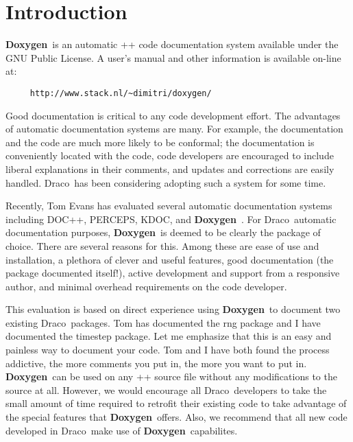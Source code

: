 \documentclass[11pt]{nmemo}
\newcommand{\draco}{{\normalfont\sffamily Draco}}
\newcommand{\doxy}{{\normalfont\bfseries Doxygen}}
\begin{document}

\section{Introduction}

\doxy\ is an automatic \C++ code documentation system available under
the GNU Public License.  A user's manual and other information is
available on-line at:
\begin{verbatim} 
     http://www.stack.nl/~dimitri/doxygen/ 
\end{verbatim}

Good documentation is critical to any code development effort.  The
advantages of automatic documentation systems are many.  For example,
the documentation and the code are much more likely to be conformal;
the documentation is conveniently located with the code, code
developers are encouraged to include liberal explanations in their
comments, and updates and corrections are easily handled.  \draco\ has
been considering adopting such a system for some time.


Recently, Tom Evans has evaluated several automatic documentation
systems including DOC++, PERCEPS, KDOC, and \doxy\ .  For \draco\ 
automatic documentation purposes, \doxy\ is deemed to be clearly the
package of choice. There are several reasons for this. Among these are
ease of use and installation, a plethora of clever and useful
features, good documentation (the package documented itself!), active
development and support from a responsive author, and minimal overhead
requirements on the code developer.


This evaluation is based on direct experience using \doxy\ to document
two existing \draco\ packages.  Tom has documented the rng package and
I have documented the timestep package.  Let me emphasize that this is
an easy and painless way to document your code. Tom and I have both
found the process addictive, the more comments you put in, the more
you want to put in. \doxy\ can be used on any \C++ source file without
any modifications to the source at all. However, we would encourage
all \draco\ developers to take the small amount of time required to
retrofit their existing code to take advantage of the special features
that \doxy\ offers.  Also, we recommend that all new code developed in
\draco\ make use of \doxy\ capabilites.

\end{document}
